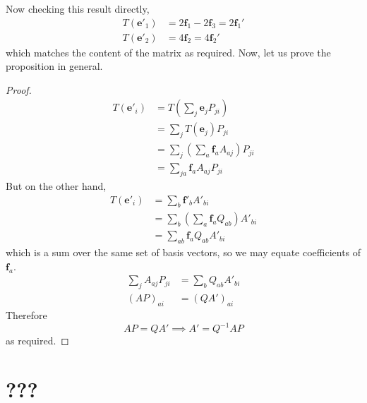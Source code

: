 \documentclass{article}
\begin{document}
	Now checking this result directly,
	\begin{align*}
		T(\bm e'_1) &= 2\bm f_1 - 2\bm f_3 = 2\bm f_1' \\
		T(\bm e'_2) &= 4\bm f_2 = 4\bm f_2'
	\end{align*}
	which matches the content of the matrix as required. Now, let us prove the proposition in general.
	\begin{proof}
		\begin{align*}
			T(\bm e'_i) &= T\left( \sum_j \bm e_j P_{ji} \right) \\
			&= \sum_j T(\bm e_j) P_{ji} \\
			&= \sum_j \left( \sum_a \bm f_a A_{aj} \right) P_{ji} \\
			&= \sum_{ja} \bm f_a A_{aj} P_{ji}
		\end{align*}
		But on the other hand,
		\begin{align*}
			T(\bm e'_i) &= \sum_b \bm f'_b A'_{bi} \\
			&= \sum_b \left( \sum_a \bm f_a Q_{ab} \right) A'_{bi} \\
			&= \sum_{ab} \bm f_a Q_{ab} A'_{bi}
		\end{align*}
		which is a sum over the same set of basis vectors, so we may equate coefficients of $\bm f_a$.
		\begin{align*}
			\sum_j A_{aj} P_{ji} &= \sum_b Q_{ab} A'_{bi} \\
			(AP)_{ai} &= (QA')_{ai}
		\end{align*}
		Therefore
		\[ AP = QA' \implies A' = Q^{-1}AP \]
		as required.
	\end{proof}

	\section{???}
\end{document}
